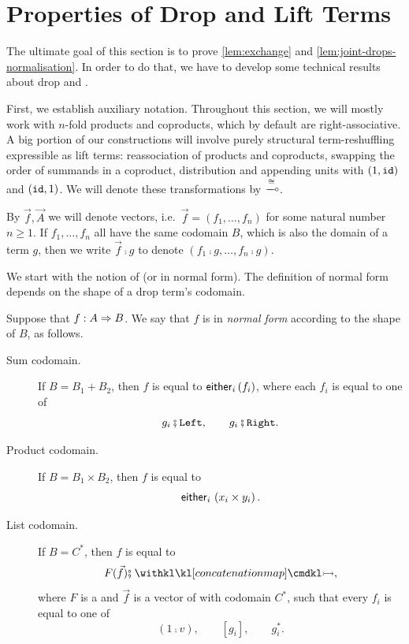 \section{Properties of Drop and Lift Terms}\label{sec:appendix-reduction-to-simple}

The ultimate goal of this section is to prove \cref{lem:exchange} and \cref{lem:joint-drops-normalisation}. In order to do that, we have to develop some technical results about drop and . 

First, we establish auxiliary notation. Throughout this section, we will mostly work with $n$-fold products and coproducts, which by default are right-associative. A big portion of our constructions will involve purely structural term-reshuffling expressible as lift terms: reassociation of products and coproducts, swapping the order of summands in a coproduct, distribution and appending units with $(1, \mathtt{id})$ and $(\mathtt{id}, 1)$. We will denote these transformations by $\lift{\cong}$. 

By $\vec f, \vec A$ we will denote vectors, i.e.~$\vec f = (f_1, \dots, f_n)$ for some natural number $n \geq 1$. If $f_1, \dots, f_n$ all have the same codomain $B$, which is also the domain of a term $g$, then we write $\vec f \comp g$ to denote $(f_1 \comp g, \dots, f_n \comp g)$.

We start with the notion of  (or  in normal form). The definition of normal form depends on the shape of a drop term's codomain.

\begin{definition}
	Suppose that $f : A \Rightarrow B$. We say that $f$ is in \emph{normal form} according to the shape of $B$, as follows.
	\begin{description}
		\item[Sum codomain.] If $B = B_1 + B_2$, then $f$ is equal to $\mathsf{either}_{i}\, (f_i)$, where each $f_i$ is equal to one of  
		\[
			g_i \comp \leftterm, \qquad g_i \comp \rightterm.
		\]

		\item[Product codomain.] If $B = B_1 \times B_2$, then $f$ is equal to
		\[
			\mathsf{either}_{i}\, \left( x_i \times y_i \right).
		\]

		\item[List codomain.] If $B = C^*$, then $f$ is equal to
		\[
			F(\vec f) \comp \concmap,
		\]
		where $F$ is a  and $\vec f$ is a vector of  with codomain $C^*$, such that every $f_i$ is equal to one of
		\[
			(1 \comp v), \qquad [g_i], \qquad g_i^*.
		\]
	\end{description}
\end{definition}

